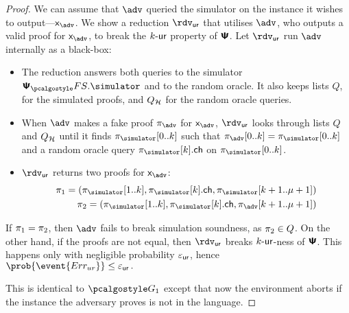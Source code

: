 \documentclass[runningheads,11pt]{llncs}
\begin{document}
\begin{proof}
  We can assume that $\adv$ queried the simulator on the instance it wishes to
  output---$\inp_{\adv}$. We show a reduction $\rdvur$ that utilises $\adv$,
  who outputs a valid proof for $\inp_{\adv}$, to break the ${k\text{-}\mathsf{ur}}$ property of
  $\bm{\mathsf{\Psi}}$. Let $\rdvur$ run $\advse$ internally as a black-box:
  \begin{itemize}
	\item The reduction answers both queries to the simulator $\psfs.\simulator$
    and to the random oracle.  It also keeps lists $Q$, for the simulated
    proofs, and $Q_{\mathcal{H}}$ for the random oracle queries.
  \item When $\adv$ makes a fake proof $\zkproof_{\adv}$ for $\inp_{\adv}$,
    $\rdvur$ looks through lists $Q$ and $Q_{\mathcal{H}}$ until it finds
    $\zkproof_{\simulator}[0..k]$ such that
    $\zkproof_{\adv}[0..k] = \zkproof_{\simulator}[0..k]$ and a random oracle
    query $\zkproof_{\simulator}[k].\ch$ on $\zkproof_{\simulator}[0..k]$.
	\item $\rdvur$ returns two proofs for $\inp_{\adv}$:
	\begin{align*}
		\zkproof_1 = (\zkproof_{\simulator}[1..k],
		\zkproof_{\simulator}[k].\ch, \zkproof_{\simulator}[k + 1..\mu + 1])\\
		\zkproof_2 = (\zkproof_{\simulator}[1..k],
		\zkproof_{\simulator}[k].\ch, \zkproof_{\adv}[k + 1..\mu + 1])
	\end{align*}
	\end{itemize}  
	If $\pi_1 = \pi_2$, then $\adv$ fails to break simulation soundness,
  as $\pi_2 \in Q$. On the other hand, if the proofs are not equal, then
  $\rdvur$ breaks ${k\text{-}\mathsf{ur}}$-ness of $\bm{\mathsf{\Psi}}$. This happens only with negligible
  probability $\varepsilon_{\mathsf{ur}}$, hence \( \prob{\event{\errur}} \leq \epsur\,. \)
	
   This is identical to $\game{1}$ except that now the environment
  aborts if the instance the adversary proves is not in the language.


\end{proof}
\end{document}

